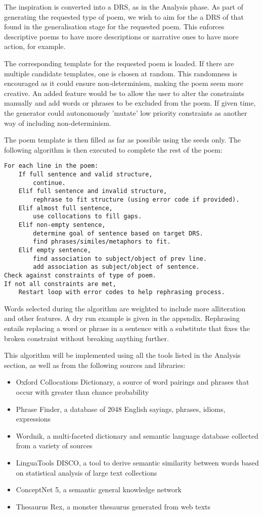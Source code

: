 The inspiration is converted into a DRS, as in the Analysis phase. As part of generating the requested type of poem, we wish to aim for the a DRS of that found in the generalisation stage for the requested poem. This enforces descriptive poems to have more descriptions or narrative ones to have more action, for example.

The corresponding template for the requested poem is loaded. If there are multiple candidate templates, one is chosen at random. This randomness is encouraged as it could ensure non-determinism, making the poem seem more creative. An added feature would be to allow the user to alter the constraints manually and add words or phrases to be excluded from the poem. If given time, the generator could autonomously 'mutate' low priority constraints as another way of including non-determinism.

The poem template is then filled as far as possible using the seeds only. The following algorithm is then executed to complete the rest of the poem:\\

\begin{lstlisting}
For each line in the poem:
	If full sentence and valid structure, 
		continue.
	Elif full sentence and invalid structure, 
		rephrase to fit structure (using error code if provided).
	Elif almost full sentence, 
		use collocations to fill gaps.
	Elif non-empty sentence,
		determine goal of sentence based on target DRS.
		find phrases/similes/metaphors to fit.
	Elif empty sentence,
		find association to subject/object of prev line.
		add association as subject/object of sentence.
Check against constraints of type of poem.
If not all constraints are met,
	Restart loop with error codes to help rephrasing process.
\end{lstlisting}		
Words selected during the algorithm are weighted to include more alliteration and other features. A dry run example is given in the appendix. Rephrasing entails replacing a word or phrase in a sentence with a substitute that fixes the broken constraint without breaking anything further. 

This algorithm will be implemented using all the tools listed in the Analysis section, as well as from the following sources and libraries:
\begin{itemize}
\setlength{\itemsep}{0pt}
\item{Oxford Collocations Dictionary, a source of word pairings and phrases that occur with greater than chance probability}
\item{Phrase Finder, a database of 2048 English sayings, phrases, idioms, expressions}
\item{Wordnik, a multi-faceted dictionary and semantic language database collected from a variety of sources}
\item{LinguaTools DISCO, a tool to derive semantic similarity between words based on statistical analysis of large text collections}
\item{ConceptNet 5, a semantic general knowledge network}
\item{Thesaurus Rex, a monster thesaurus generated from web texts}
\end{itemize}

